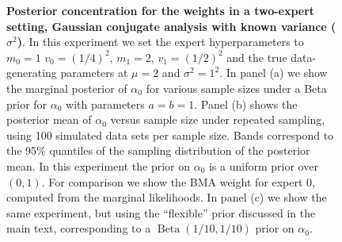 \documentclass[a4paper, notitlepage, 11pt]{article}
\begin{document}
\begin{figure}[!ht]
\begin{center}
\end{center}
\caption{\textbf{Posterior concentration for the weights in a two-expert setting, Gaussian conjugate analysis with known variance ($\sigma^2$)}.
In this experiment we set the expert hyperparameters to $m_0 = 1$ $v_0 = (1/4)^2$, $m_1 = 2$, $v_1 = (1/2)^2$ and the true data-generating parameters at $\mu = 2$ and $\sigma^2 = 1^2$.
In panel (a) we show the marginal posterior of $\alpha_0$ for various sample sizes under a Beta prior for $\alpha_0$ with parameters $a = b = 1$.
Panel (b) shows the posterior mean of $\alpha_0$ versus sample size under repeated sampling, using 100 simulated data sets per sample size. 
Bands correspond to the 95\% quantiles of the sampling distribution of the posterior mean.
In this experiment the prior on $\alpha_0$ is a uniform prior over $(0, 1)$.
For comparison we show the BMA weight for expert 0, computed from the marginal likelihoods.
In panel (c) we show the same experiment, but using the ``flexible'' prior discussed in the main text, corresponding to a $\operatorname{Beta}(1/10, 1/10)$ prior on $\alpha_0$.
}
\label{fig:concentration_results_normal}
\end{figure}
\end{document}
